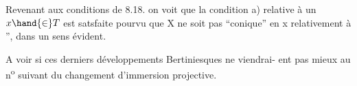 Revenant aux conditions de 8.18. on voit que la condition a)
relative à un $x \hand{\in} T$ est satsfaite pourvu que X ne soit pas ``conique''
en x relativement à '', dans un sens évident.

A voir si ces derniers développements Bertiniesques ne viendrai-%
ent pas mieux au n\textsuperscript{o} suivant du changement d'immersion projective. 

